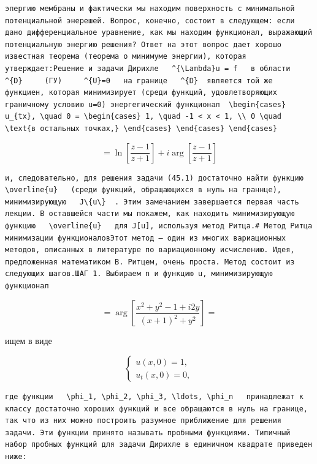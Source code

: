 \documentclass[
  ukrainian,
]{article}
\begin{document}
\begin{verbatim}
эпергию мембраны и фактически мы находим поверхность с минимальной потенциальной энерешей. Вопрос, конечно, состоит в следующем: если дано дифференциальное уравнение, как мы находим функционал, выражающий потенциальную энергию решения? Ответ на этот вопрос дает хорошо известная теорема (теорема о минимуме энергии), которая утверждает:Решение и задачи Дирихле   ^{\Lambda}u = f   в области   ^{D}     (ГУ)     ^{U}=0   на границе   ^{D}  является той же функциен, которая минимизирует (среди функций, удовлетворяющих граничному условию u=0) энергегический функционал  \begin{cases} u_{tx}, \quad 0 = \begin{cases} 1, \quad -1 < x < 1, \\ 0 \quad \text{в остальных точках,} \end{cases} \end{cases} \end{cases}
\end{verbatim}

\[
= \ln\left[\frac{z-1}{z+1}\right] + i \arg\left[\frac{z-1}{z+1}\right]
\]

\begin{verbatim}
и, следовательно, для решения задачи (45.1) достаточно найти функцию   \overline{u}   (среди функций, обращающихся в нуль на граннце), минимизирующую   J\{u\}  . Этим замечанием завершается первая часть лекции. В оставшейся части мы покажем, как находить минимизирующую функцию   \overline{u}   для J[u], используя метод Ритца.# Метод Ритца минимизации функционаловЭтот метод — один из многих вариационных методов, описанных в литературе по вариационному исчислению. Идея, предложенная математиком В. Ритцем, очень проста. Метод состоит из следующих шагов.ШАГ 1. Выбираем n и функцию u, минимизирующую функционал
\end{verbatim}

\[
= \arg\left[\frac{x^2+y^2-1+i2y}{(x+1)^2+y^2}\right] =
\]

ищем в виде

\[
\begin{cases} u(x, 0) = 1, \\ u_t(x, 0) = 0, \end{cases}
\]

\begin{verbatim}
где функции   \phi_1, \phi_2, \phi_3, \ldots, \phi_n   принадлежат к классу достаточно хороших функций и все обращаются в нуль на границе, так что из них можно построить разумное приближение для решения задачи. Эти функции принято называть пробными функциями. Типичный набор пробных функций для задачи Дирихле в единичном квадрате приведен ниже:
\end{verbatim}
\end{document}
